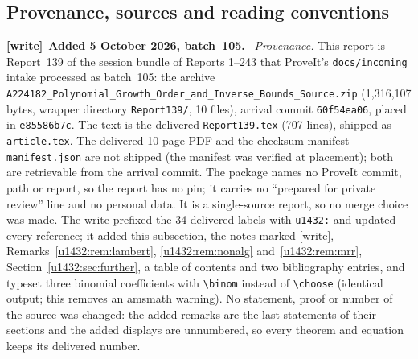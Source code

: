 \documentclass[11pt]{article}
\theoremstyle{remark}\newtheorem{remark}[theorem]{Remark}
\newcommand{\file}[1]{\nolinkurl{#1}}
\newenvironment{writenote}[1][]{\par\smallskip\begingroup\small
 \noindent\textbf{[write]}\if\relax\detokenize{#1}\relax\else~\textbf{#1.}\fi\ }%
 {\par\endgroup\smallskip}
\begin{document}
\subsection{Provenance, sources and reading conventions}\label{u1432:sec:provenance}
\begin{writenote}[Added 5 October 2026, batch~105]
\emph{Provenance.} This report is Report~139 of the session bundle of
Reports 1--243 that ProveIt's \file{docs/incoming} intake processed as
batch~105: the archive
\file{A224182_Polynomial_Growth_Order_and_Inverse_Bounds_Source.zip}
(1{,}316{,}107 bytes, wrapper directory \file{Report139/}, 10 files),
arrival commit \file{60f54ea06}, placed in \file{e85586b7c}. The text is the
delivered \file{Report139.tex} (707 lines), shipped as \file{article.tex}.
The delivered 10-page PDF and the checksum manifest \file{manifest.json} are
not shipped (the manifest was verified at placement); both are retrievable
from the arrival commit. The package names no ProveIt commit, path or
report, so the report has no pin; it carries no ``prepared for private
review'' line and no personal data. It is a single-source report, so no merge
choice was made. The write prefixed the 34 delivered labels with
\file{u1432:} and updated every reference; it added this subsection, the
notes marked [write], Remarks~\ref{u1432:rem:lambert},
\ref{u1432:rem:nonalg} and~\ref{u1432:rem:mrr},
Section~\ref{u1432:sec:further}, a table of contents and two bibliography
entries, and typeset three binomial coefficients with \verb|\binom| instead
of \verb|\choose| (identical output; this removes an \textsf{amsmath}
warning). No statement, proof or number of the source was changed: the
added remarks are the last statements of their sections and the added
displays are unnumbered, so every theorem and equation keeps its delivered
number.


\end{writenote}
\end{document}
